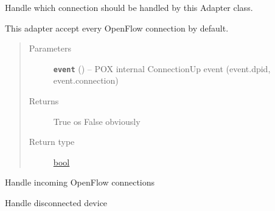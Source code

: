 \documentclass[letterpaper,10pt,english]{sphinxmanual}
\begin{document}
\begin{fulllineitems}
\begin{fulllineitems}
\begin{quote}
\begin{description}
\end{description}\end{quote}

\end{fulllineitems}


\begin{fulllineitems}
\label{adapt/domain_adapters:escape.adapt.domain_adapters.POXDomainAdapter.filter_connections}
Handle which connection should be handled by this Adapter class.

This adapter accept every OpenFlow connection by default.
\begin{quote}\begin{description}
\item[{Parameters}] \leavevmode
\textbf{\texttt{event}} () -- POX internal ConnectionUp event (event.dpid, event.connection)

\item[{Returns}] \leavevmode
True os False obviously

\item[{Return type}] \leavevmode
\href{https://docs.python.org/2.7/library/functions.html\#bool}{bool}

\end{description}\end{quote}

\end{fulllineitems}


\begin{fulllineitems}
\label{adapt/domain_adapters:escape.adapt.domain_adapters.POXDomainAdapter._handle_ConnectionUp}
Handle incoming OpenFlow connections

\end{fulllineitems}


\begin{fulllineitems}
\label{adapt/domain_adapters:escape.adapt.domain_adapters.POXDomainAdapter._handle_ConnectionDown}
Handle disconnected device


\end{fulllineitems}
\end{fulllineitems}
\end{document}
